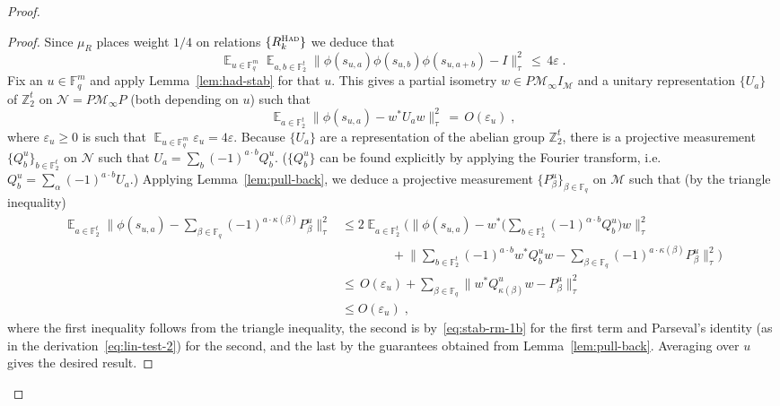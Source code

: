 \documentclass[11pt]{article}
\theoremstyle{definition}
\newcommand{\Id}{\ensuremath{I}}
\DeclareMathOperator*{\Expectation}{\mathbb{E}}
\newcommand{\Es}[1]{\Expectation_{#1}}
\newcommand{\F}{\ensuremath{\mathbb{F}}}
\newcommand{\Z}{\ensuremath{\mathbb{Z}}}
\newcommand{\mM}{\ensuremath{\mathcal{M}}}
\newcommand{\had}{\textsc{Had}}
\newcommand{\eps}{\varepsilon}
\newcommand{\mN}{\mathcal{N}}
\begin{document}
\begin{proof}
\begin{proof}
Since $\mu_R$ places weight $1/4$ on relations $\{R^\had_k\}$ we deduce that 
\begin{equation}\label{eq:stab-rm-1}
\Es{u\in \F_q^m} \Es{a,b\in \F_2^t} \big\|\phi(s_{u,a})\phi(s_{u,b})\phi(s_{u,a+b})-\Id\big\|_\tau^2 \,\leq\, 4\eps\;. 
\end{equation}
Fix an $u\in \F_q^m$ and apply Lemma~\ref{lem:had-stab} for that $u$. This gives a partial isometry $w\in P\mM_\infty\Id_\mM$ and a unitary representation $\{U_a\}$ of $\Z_2^t$ on $\mN=P\mM_\infty P$ (both depending on $u$) such that 
\begin{equation}\label{eq:stab-rm-1b}
 \Es{a \in \F_2^t} \big\| \phi(s_{u,a}) - w^* U_a w \big\|_\tau^2 \,=\, O(\eps_u)\;,
\end{equation}
where $\eps_u\geq 0$ is such that $\Es{u\in \F_q^m} \eps_u = 4\eps$. Because $\{U_a\}$ are a representation of the abelian group $\Z_2^t$, there is a projective measurement $\{Q^u_b\}_{b\in \F_2^t}$ on $\mN$ such that $U_a = \sum_b (-1)^{a\cdot b} Q^u_b$. ($\{Q^u_b\}$ can be found explicitly by applying the Fourier transform, i.e.\ $Q^u_b = \sum_\alpha (-1)^{a \cdot b} U_a$.) Applying Lemma~\ref{lem:pull-back}, we deduce a projective measurement $\{P^u_\beta\}_{\beta\in \F_q}$ on $\mM$ such that (by the triangle inequality)
\begin{align*}
 \Es{a \in \F_2^t} \Big\| \phi(s_{u,a}) - \sum_{\beta\in\F_q} (-1)^{a \cdot \kappa(\beta)} P^u_\beta \Big\|_\tau^2
&\leq 2 \Es{a \in \F_2^t} \Big( \Big\| \phi(s_{u,a}) - w^*\Big(\sum_{b\in\F_2^t} (-1)^{\alpha \cdot b} Q^u_b \Big) w \Big\|_\tau^2 \\
&\qquad\qquad+   \Big\|  \sum_{b\in\F_2^t} (-1)^{a \cdot b} w^* Q^u_b w - \sum_{\beta\in\F_q} (-1)^{a \cdot \kappa(\beta)} P^u_\beta \Big\|_\tau^2\Big)\\
 &\leq\, O(\eps_u) +  \sum_{\beta\in\F_q} \Big\| w^* Q^u_{\kappa(\beta)} w - P^u_{\beta} \Big\|_\tau^2\\
&\leq O(\eps_u)\;,
\end{align*}
where the first inequality follows from the triangle inequality, the second is by~\eqref{eq:stab-rm-1b} for the first term and Parseval's identity (as in the derivation~\eqref{eq:lin-test-2}) for the second, and the last by the guarantees obtained from Lemma~\ref{lem:pull-back}. Averaging over $u$ gives the desired result.
\end{proof}


\end{proof}
\end{document}
